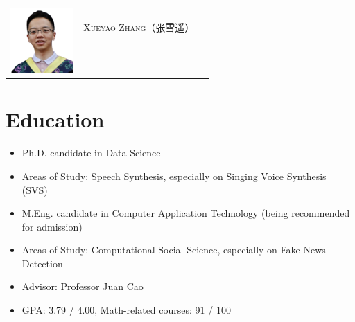 \documentclass{resume}
\begin{document}

\Large{
  \begin{tabu}{ c l l }
    & \scshape{Xueyao Zhang（张雪遥）} &  \\
    &  &  \\
    &  &  \\
    & 
    &  
  \end{tabu}
}

\section{Education}
{
  \small 
\begin{itemize}
  \item Ph.D. candidate in Data Science
  \item Areas of Study: Speech Synthesis, especially on Singing Voice Synthesis (SVS)
\end{itemize}
}

{
  \small 
\begin{itemize}
  \item M.Eng. candidate in Computer Application Technology (being recommended for admission)
  \item Areas of Study: Computational Social Science, especially on Fake News Detection
  \item Advisor: Professor Juan Cao
  \item GPA: 3.79 / 4.00, Math-related courses: 91 / 100
\end{itemize}
}
\end{document}
